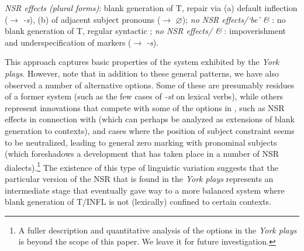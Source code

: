 \documentclass[output=paper]{langsci/langscibook}
\begin{document}
\ea \label{ex:10:29}
\ea \textit{\gls{NSR} effects (plural forms)}: blank generation of T, repair via (a) default inflection ($\rightarrow$ \emph{-s}), (b)  of adjacent subject pronouns ($\rightarrow$ $\varnothing$);
\ex \textit{no \gls{NSR} effects/`be' \& \Fsg{}}: no blank generation of T, regular syntactic ;
\ex \textit{no \gls{NSR} effects/\Ssg{} \& \Tsg{}}:
impoverishment and underspecification of markers
($\rightarrow$ \emph{-s}).
\z
\z

This approach captures basic properties of the  system exhibited by
the \emph{York plays}. However, note that in addition to these general
patterns, we have also observed a number of alternative  options. Some
of these are presumably residues of a former system (such as the few cases of
\Ssg{} \emph{-st} on lexical verbs), while others represent innovations that
compete with some of the options in , such as \gls{NSR} effects in
connection with \Fsg{} (which can perhaps be analyzed as extensions of blank
generation to \Fsg{} contexts), and cases where the position of subject
constraint seems to be neutralized, leading to general zero marking with
pronominal subjects (which foreshadows a development that has taken place in a
number of \gls{NSR} dialects).\footnote{A fuller description and quantitative
    analysis of the  options in the \emph{York plays} is beyond the scope
of this paper. We leave it for future investigation.} The existence of this
type of linguistic variation suggests that the particular version of the
\gls{NSR} that is found in the \emph{York plays} represents an intermediate
stage that eventually gave way to a more balanced  system where blank
generation of T/INFL is not (lexically) confined to certain contexts.
\end{document}
